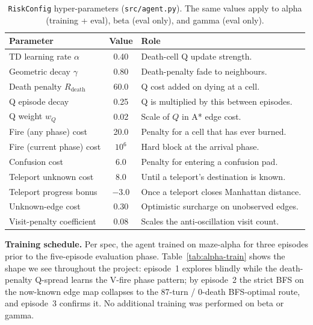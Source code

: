 \documentclass[11pt]{article}
\begin{document}
\begin{table}[H]
\centering
\caption{\texttt{RiskConfig} hyper-parameters (\texttt{src/agent.py}).
The same values apply to alpha (training + eval), beta (eval only),
and gamma (eval only).}
\label{tab:hparams}
\begin{tabular}{lcl}
\toprule
Parameter & Value & Role \\
\midrule
TD learning rate $\alpha$         & 0.40        & Death-cell Q update strength. \\
Geometric decay $\gamma$          & 0.80        & Death-penalty fade to neighbours. \\
Death penalty $R_\text{death}$    & 60.0        & Q cost added on dying at a cell. \\
Q episode decay                   & 0.25        & Q is multiplied by this between episodes. \\
Q weight $w_Q$                    & 0.02        & Scale of $Q$ in A* edge cost. \\
Fire (any phase) cost             & 20.0        & Penalty for a cell that has ever burned. \\
Fire (current phase) cost         & $10^{6}$    & Hard block at the arrival phase. \\
Confusion cost                    & 6.0         & Penalty for entering a confusion pad. \\
Teleport unknown cost             & 8.0         & Until a teleport's destination is known. \\
Teleport progress bonus           & $-3.0$      & Once a teleport closes Manhattan distance. \\
Unknown-edge cost                 & 0.30        & Optimistic surcharge on unobserved edges. \\
Visit-penalty coefficient         & 0.08        & Scales the anti-oscillation visit count. \\
\bottomrule
\end{tabular}
\end{table}

\textbf{Training schedule.}  Per spec, the agent trained on maze-alpha
for three episodes prior to the five-episode evaluation phase.
Table~\ref{tab:alpha-train} shows the shape we see throughout the
project: episode~1 explores blindly while the death-penalty Q-spread
learns the V-fire phase pattern; by episode~2 the strict BFS on the
now-known edge map collapses to the 87-turn / 0-death BFS-optimal
route, and episode~3 confirms it.  No additional training was
performed on beta or gamma.
\end{document}
